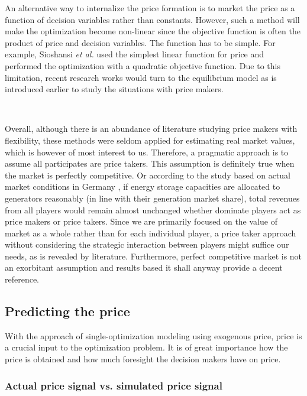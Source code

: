 An alternative way to internalize the price formation is to market the price as a function of decision variables rather than constants. However, such a method will make the optimization become non-linear since the objective function is often the product of price and decision variables. The function has to be simple. For example, Sioshansi \textit{et al.} \cite{Sioshansi2009,Sioshansi2010} used the simplest linear function for price and performed the optimization with a quadratic objective function. Due to this limitation, recent research works would turn to the equilibrium model as is introduced earlier to study the situations with price makers. 

~\newline

Overall, although there is an abundance of literature studying price makers with flexibility, these methods were seldom applied for estimating real market values, which is however of most interest to us. Therefore, a pragmatic approach is to assume all participates are price takers. This assumption is definitely true when the market is perfectly competitive. Or according to the study based on actual market conditions in Germany \cite{Schill2011}, if energy storage capacities are allocated to generators reasonably (in line with their generation market share), total revenues from all players would remain almost unchanged whether dominate players act as price makers or price takers. Since we are primarily focused on the value of market as a whole rather than for each individual player, a price taker approach without considering the strategic interaction between players might suffice our needs, as is revealed by literature. Furthermore, perfect competitive market is not an exorbitant assumption and results based it shall anyway provide a decent reference.

\subsection{Predicting the price}

With the approach of single-optimization modeling using exogenous price, price is a crucial input to the optimization problem. It is of great importance how the price is obtained and how much foresight the decision makers have on price.

\subsubsection{Actual price signal vs. simulated price signal}

